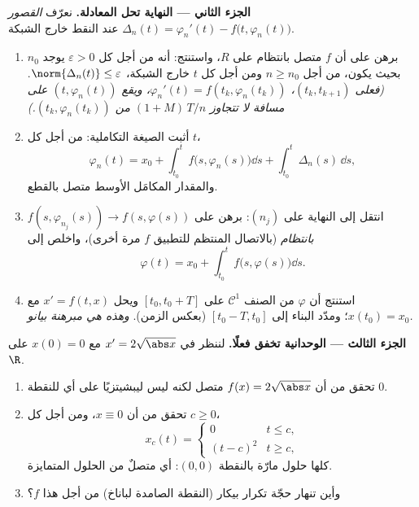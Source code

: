 \begin{problem}[{مسألة نهاية الأسبوع --- وجود حلول المعادلة
$x' = f(t, x)$ دون شرط ليبشيتز}]
\medskip
\noindent\textbf{الجزء الثاني --- النهاية تحل المعادلة.} نعرّف
\emph{القصور} $\Delta_n(t) = \varphi_n'(t) -
f\bigl(t, \varphi_n(t)\bigr)$ عند النقط خارج الشبكة.
\begin{enumerate}[resume]
  \item برهن على أن $f$ متصل بانتظام على $R$، واستنتج: أنه من
        أجل كل $\varepsilon > 0$ يوجد $n_0$ بحيث يكون، من أجل $n \geq n_0$
        ومن أجل كل $t$ خارج الشبكة، $\norm{\Delta_n(t)} \leq \varepsilon$. \emph{(فعلى $(t_k,
        t_{k+1})$،
        $\varphi_n'(t) = f(t_k, \varphi_n(t_k))$، ويقع $(t, \varphi_n(t))$ على مسافة لا تتجاوز
        $(1 + M)\,T/n$ من $(t_k, \varphi_n(t_k))$.)}
  \item أثبت الصيغة التكاملية: من أجل كل $t$،
        \[
        \varphi_n(t) = x_0 + \int_{t_0}^{t}
        f\bigl(s, \varphi_n(s)\bigr)\dd s +
        \int_{t_0}^t \Delta_n(s)\,\dd s,
        \]
        والمقدار المكامَل الأوسط متصل بالقطع.
  \item انتقل إلى النهاية على $(n_j)$: برهن على $f(s, \varphi_{n_j}(s)) \to f(s, \varphi(s))$
        \emph{بانتظام} (بالاتصال المنتظم للتطبيق $f$ مرة أخرى)،
        واخلص إلى
        \[
        \varphi(t) = x_0 + \int_{t_0}^t
        f\bigl(s, \varphi(s)\bigr)\dd s .
        \]
  \item استنتج أن $\varphi$ من الصنف $\mathcal C^1$ على $[t_0, t_0 +
        T]$
        ويحل $x' = f(t, x)$ مع $x(t_0) = x_0$؛ ومدّد البناء إلى
        $[t_0 - T, t_0]$ (بعكس الزمن). \emph{وهذه هي مبرهنة
        بيانو.}
\end{enumerate}

\medskip
\noindent\textbf{الجزء الثالث --- الوحدانية تخفق فعلًا.} لننظر
في $x' = 2\sqrt{\abs x}$ مع $x(0) = 0$ على $\R$.
\begin{enumerate}[resume]
  \item تحقق من أن $f(x) = 2\sqrt{\abs x}$ متصل لكنه ليس ليبشيتزيًا على أي 
        للنقطة $0$.
  \item تحقق من أن $x \equiv 0$، ومن أجل كل $c \geq 0$،
        \[
        x_c(t) = \begin{cases} 0 & t \leq c,\\ (t - c)^2 & t
        \geq c,\end{cases}
        \]
        كلها حلول مارّة بالنقطة $(0,0)$: أي متصلٌ من الحلول
        المتمايزة.
  \item وأين تنهار حجّة تكرار بيكار (النقطة الصامدة لباناخ) من
        أجل هذا $f$؟
\end{enumerate}


\end{problem}
